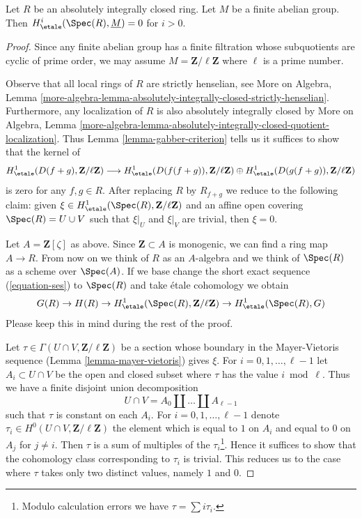 \begin{proposition}
\label{proposition-aic-vanishing}
Let $R$ be an absolutely integrally closed ring.
Let $M$ be a finite abelian group.
Then $H^i_\etale(\Spec(R), \underline{M}) = 0$ for $i > 0$.
\end{proposition}

\begin{proof}
Since any finite abelian group has a finite filtration whose
subquotients are cyclic of prime order, we may assume
$M = \mathbf{Z}/\ell\mathbf{Z}$ where $\ell$ is a prime number.

\medskip\noindent
Observe that all local rings of $R$ are strictly henselian, see
More on Algebra, Lemma
\ref{more-algebra-lemma-absolutely-integrally-closed-strictly-henselian}.
Furthermore, any localization of $R$ is also absolutely integrally closed
by More on Algebra, Lemma
\ref{more-algebra-lemma-absolutely-integrally-closed-quotient-localization}.
Thus Lemma \ref{lemma-gabber-criterion} tells us it suffices to
show that the kernel of
$$
H^1_\etale(D(f + g), \mathbf{Z}/\ell\mathbf{Z})
\longrightarrow
H^1_\etale(D(f(f + g)), \mathbf{Z}/\ell\mathbf{Z}) \oplus
H^1_\etale(D(g(f + g)), \mathbf{Z}/\ell\mathbf{Z})
$$
is zero for any $f, g \in R$. After replacing $R$ by $R_{f + g}$ we
reduce to the following claim: given
$\xi \in H^1_\etale(\Spec(R), \mathbf{Z}/\ell\mathbf{Z})$
and an affine open covering $\Spec(R) = U \cup V$
such that $\xi|_U$ and $\xi|_V$ are trivial, then $\xi = 0$.

\medskip\noindent
Let $A = \mathbf{Z}[\zeta]$ as above.
Since $\mathbf{Z} \subset A$ is monogenic, we can find a ring
map $A \to R$. From now on we think of $R$ as an $A$-algebra
and we think of $\Spec(R)$ as a scheme over $\Spec(A)$.
If we base change the short exact sequence (\ref{equation-ses})
to $\Spec(R)$ and take \'etale cohomology we obtain
$$
G(R) \to H(R) \to
H^1_\etale(\Spec(R), \mathbf{Z}/\ell\mathbf{Z}) \to
H^1_\etale(\Spec(R), G)
$$
Please keep this in mind during the rest of the proof.

\medskip\noindent
Let $\tau \in \Gamma(U \cap V, \mathbf{Z}/\ell\mathbf{Z})$
be a section whose boundary in the Mayer-Vietoris sequence
(Lemma \ref{lemma-mayer-vietoris}) gives $\xi$.
For $i = 0, 1, \ldots, \ell - 1$ let $A_i \subset U \cap V$
be the open and closed subset where $\tau$ has the value $i \bmod \ell$.
Thus we have a finite disjoint union decomposition
$$
U \cap V = A_0 \amalg \ldots \amalg A_{\ell - 1}
$$
such that $\tau$ is constant on each $A_i$. For
$i = 0, 1, \ldots, \ell - 1$
denote $\tau_i \in H^0(U \cap V, \mathbf{Z}/\ell\mathbf{Z})$
the element which is equal to $1$ on $A_i$ and
equal to $0$ on $A_j$ for $j \not = i$.
Then $\tau$ is a sum of multiples of the $\tau_i$\footnote{Modulo
calculation errors we have $\tau = \sum i \tau_i$.}.
Hence it suffices to show that the cohomology class corresponding
to $\tau_i$ is trivial. This reduces us to the case where
$\tau$ takes only two distinct values, namely $1$ and $0$.


\end{proof}
